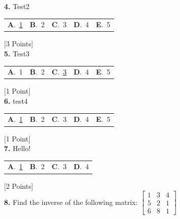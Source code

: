 \documentclass[12pt]{article}
\newcommand{\choice}[2]{\textbf{#1}.~#2}
\begin{document}
\noindent \textbf{\textenglish{4.}} {\textenglish{Test2}}

\begin{tabularx}{\linewidth}{@{}*{5}{Y}@{}}
\choice{A}{{\underline{{\textenglish{1}}}}} & \choice{B}{{{\textenglish{2}}}} & \choice{C}{{{\textenglish{3}}}} & \choice{D}{{{\textenglish{4}}}} & \choice{E}{{{\textenglish{5}}}} \\
\end{tabularx}
\hfill {\textenglish{[3 Points]}}\\[0.5em]

\noindent \textbf{\textenglish{5.}} {\textenglish{Test3}}

\begin{tabularx}{\linewidth}{@{}*{5}{Y}@{}}
\choice{A}{{{\textenglish{1}}}} & \choice{B}{{{\textenglish{2}}}} & \choice{C}{{\underline{{\textenglish{3}}}}} & \choice{D}{{{\textenglish{4}}}} & \choice{E}{{{\textenglish{5}}}} \\
\end{tabularx}
\hfill {\textenglish{[1 Point]}}\\[0.5em]

\noindent \textbf{\textenglish{6.}} {\textenglish{test4}}

\begin{tabularx}{\linewidth}{@{}*{5}{Y}@{}}
\choice{A}{{\underline{{\textenglish{1}}}}} & \choice{B}{{{\textenglish{2}}}} & \choice{C}{{{\textenglish{3}}}} & \choice{D}{{{\textenglish{4}}}} & \choice{E}{{{\textenglish{5}}}} \\
\end{tabularx}
\hfill {\textenglish{[1 Point]}}\\[0.5em]

\noindent \textbf{\textenglish{7.}} {\textenglish{Hello!}}

\begin{tabularx}{\linewidth}{@{}*{4}{Y}@{}}
\choice{A}{{\underline{{\textenglish{1}}}}} & \choice{B}{{{\textenglish{2}}}} & \choice{C}{{{\textenglish{3}}}} & \choice{D}{{{\textenglish{4}}}} \\
\end{tabularx}
\hfill {\textenglish{[2 Points]}}\\[0.5em]

\noindent \textbf{\textenglish{8.}} {\textenglish{Find the inverse of the following matrix: }}\(\begin{bmatrix} 1 & 3 & 4 \\ 5 & 2 & 1 \\ 6 & 8 & 1 \end{bmatrix}\)
\end{document}
